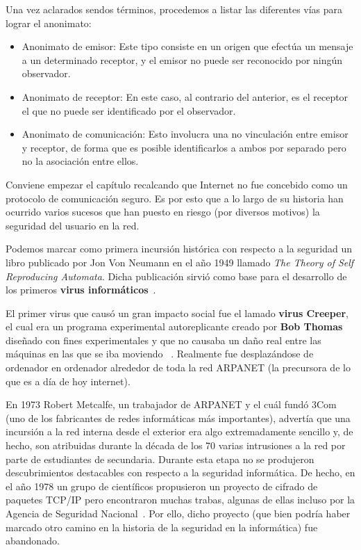 Una vez aclarados sendos términos, procedemos a listar las diferentes vías para lograr el anonimato:

\begin{itemize}
	\item Anonimato de emisor: Este tipo consiste en un origen que efectúa un mensaje a un determinado receptor, y el emisor no puede ser reconocido por ningún observador.
	\item Anonimato de receptor: En este caso, al contrario del anterior, es el receptor el que no puede ser identificado por el observador.
	\item Anonimato de comunicación: Esto involucra una no vinculación entre emisor y receptor, de forma que es posible identificarlos a ambos por separado pero no la asociación entre ellos.

\end{itemize}

 \label{sec:historia}

Conviene empezar el capítulo recalcando que Internet no fue concebido como un protocolo de comunicación seguro. 
Es por esto que a lo largo de su historia han ocurrido varios sucesos que han puesto en riesgo (por diversos motivos) la seguridad del usuario en la red.

Podemos marcar como primera incursión histórica con respecto a la seguridad un libro publicado por Jon Von Neumann en el año 1949 llamado \textit{The Theory of Self Reproducing Automata}. Dicha publicación sirvió como  base para el desarrollo de los primeros \textbf{virus informáticos}~\cite{article:automata}.

El primer virus que causó un gran impacto social fue el lamado \textbf{virus Creeper}, el cual era un programa experimental autoreplicante creado por \textbf{Bob Thomas} diseñado con fines experimentales y que no causaba un daño real entre las máquinas en las que se iba moviendo ~\cite{article:motivationvirus}.
Realmente fue desplazándose de ordenador en ordenador alrededor de toda la red ARPANET (la precursora de lo que es a día de hoy internet).

En 1973 Robert Metcalfe, un trabajador de ARPANET y el cuál fundó 3Com (uno de los fabricantes de redes informáticas más importantes), advertía que una incursión a la red interna desde el exterior era algo extremadamente sencillo y, de hecho, son atribuidas durante la década de los 70 varias intrusiones a la red por parte de estudiantes de secundaria. 
Durante esta etapa no se produjeron descubrimientos destacables con respecto a la seguridad informática. De hecho, en el año 1978 un grupo de científicos propusieron un proyecto de cifrado de paquetes TCP/IP pero encontraron muchas trabas, algunas de ellas incluso por la Agencia de Seguridad Nacional~\cite{article:nsa_tcp}. Por ello, dicho proyecto (que bien podría haber marcado otro camino en la historia de la seguridad en la informática) fue abandonado. 


